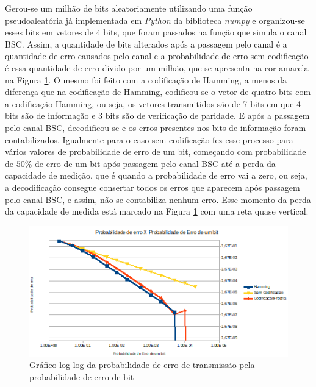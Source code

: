 \documentclass[journal,comsoc]{IEEEtran}
\begin{document}
		Gerou-se um milhão de bits aleatoriamente utilizando uma função pseudoaleatória	já implementada em \emph{Python} da biblioteca \emph{numpy} e organizou-se esses bits em vetores de 4 bits, que foram passados na função que simula o canal BSC. Assim, a quantidade de bits alterados após a passagem pelo canal é a quantidade de erro causados pelo canal e a probabilidade de	erro sem codificação é essa quantidade de erro divido por um milhão, que se apresenta na cor amarela na Figura \ref{fig:A}. O mesmo foi feito com a codificação de Hamming, a menos da	diferença que na codificação de Hamming, codificou-se o	vetor de quatro bits com a codificação Hamming, ou seja, os vetores transmitidos são de 7 bits em que 4 bits são de informação e 3 bits são de verificação de paridade. E após a passagem pelo canal BSC, decodificou-se e os erros presentes nos bits de informação foram contabilizados. Igualmente para o caso sem codificação fez esse processo para vários valores de probabilidade de erro de um bit, começando com probabilidade de $50\%$ de erro de um bit após passagem pelo canal BSC até a perda da capacidade de medição, que é quando a probabilidade de erro vai a zero, ou seja, a decodificação consegue consertar todos os erros que aparecem	após passagem pelo canal BSC, e assim, não se contabiliza nenhum erro. Esse momento da perda da capacidade de medida está marcado na Figura \ref{fig:A} com uma reta quase vertical.
		
		\begin{figure}[hbt]
			\centering
			\includegraphics[width=\columnwidth]{../img/PeXp.png}%
			\caption{Gráfico log-log da probabilidade de erro de transmissão pela probabilidade de erro de bit}%
			\label{fig:A}%
		\end{figure}
		
\end{document}
